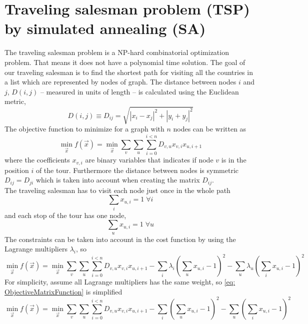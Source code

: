 \section{Traveling salesman problem (TSP) by simulated annealing (SA)}
The traveling salesman problem is a NP-hard combinatorial optimization problem. That means it does not have a polynomial time solution. The goal of our traveling salesman is to find the shortest path for visiting all the countries in a list which are represented by nodes of graph. The distance between nodes $i$ and $j$, $D(i,j)$ -- measured in units of length -- is calculated using the Euclidean metric,
\begin{equation}
    D(i,j) \equiv D_{ij}= \sqrt{\left|x_{i} - x_{j}\right|^{2} + \left|y_{i} + y_{j} \right|^{2}} 
\end{equation}
The objective function to minimize for a graph with $n$ nodes can be written as
\begin{equation}
\label{eq:TSP_noconstraints}
    \min_{\vec{x}} f(\vec{x}) = \min_{\vec{x}} \sum_{v} \sum_{u} \sum_{i=0}^{i<n}D_{v,u}x_{v,i}x_{u, i+1}
\end{equation}
where the coefficients $x_{v,i}$ are binary variables that indicates if node $v$ is in the position $i$ of the tour. Furthermore the distance between nodes is symmetric $D_{ij} = D_{ji}$ which is taken into account when creating the matrix $D_{ij}$.\\
The traveling salesman has to visit each node just once in the whole path
\begin{equation}
    \sum_{i}x_{u,i} = 1 \; \forall i
\end{equation}
and each stop of the tour has one node,
\begin{equation}
    \sum_{u}x_{u, i} = 1 \; \forall u
\end{equation}
The constraints can be taken into account in the cost function by using the Lagrange multipliers $\lambda_{i}$, so
\begin{equation}
    \label{eq: ObjectiveMatrixFunction}
   \min_{\vec{x}} f(\vec{x}) = \min_{\vec{x}} \sum_{v} \sum_{u} \sum_{i=0}^{i<n}D_{v,u}x_{v,i}x_{u, i+1} - \sum_{i}\lambda_{i}\left(\sum_{u} x_{u, i} - 1\right)^{2} - \sum_{u}\lambda_{u} \left( \sum_{i}x_{u,i} - 1\right)^{2}
\end{equation}
For simplicity, assume all Lagrange multipliers has the same weight, so \ref{eq: ObjectiveMatrixFunction} is simplified 
\begin{equation}
    \min_{\vec{x}} f(\vec{x}) = \min_{\vec{x}} \sum_{v} \sum_{u} \sum_{i=0}^{i<n}D_{v,u}x_{v,i}x_{u, i+1} - \sum_{i}\left(\sum_{u} x_{u, i} - 1\right)^{2} - \sum_{u}\left( \sum_{i}x_{u,i} - 1\right)^{2} 
\end{equation}
